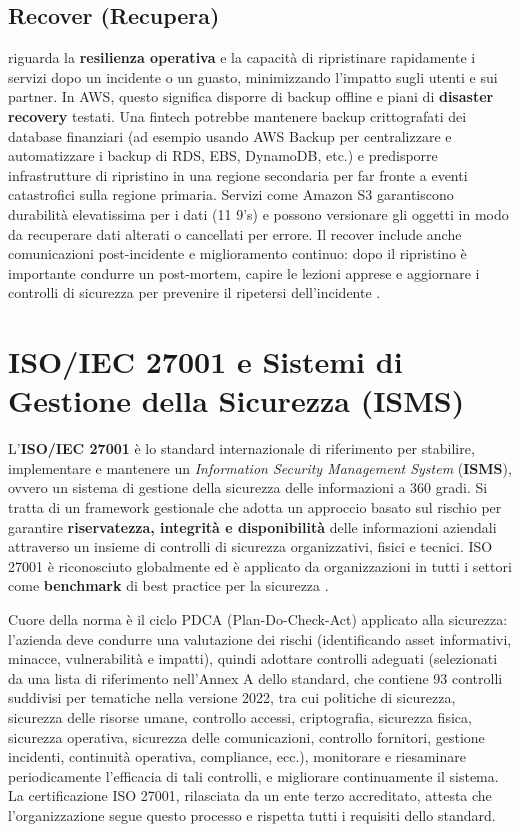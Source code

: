 \documentclass[a4paper,12pt]{report}
\begin{document}
\subsection{Recover (Recupera)}
\label{subsec:nist_csf_recover}
riguarda la \textbf{resilienza operativa} e la capacità di ripristinare rapidamente i servizi dopo un incidente o un guasto, minimizzando l'impatto sugli utenti e sui partner. In AWS, questo significa disporre di backup offline e piani di \textbf{disaster recovery} testati. Una fintech potrebbe mantenere backup crittografati dei database finanziari (ad esempio usando AWS Backup per centralizzare e automatizzare i backup di RDS, EBS, DynamoDB, etc.) e predisporre infrastrutture di ripristino in una regione secondaria per far fronte a eventi catastrofici sulla regione primaria. Servizi come Amazon S3 garantiscono durabilità elevatissima per i dati (11 9's) e possono versionare gli oggetti in modo da recuperare dati alterati o cancellati per errore. Il recover include anche comunicazioni post-incidente e miglioramento continuo: dopo il ripristino è importante condurre un post-mortem, capire le lezioni apprese e aggiornare i controlli di sicurezza per prevenire il ripetersi dell'incidente \cite{awsWhitepaper}.

\section{ISO/IEC 27001 e Sistemi di Gestione della Sicurezza (ISMS)}
\label{sec:iso_27001}
L'\textbf{ISO/IEC 27001} è lo standard internazionale di riferimento per stabilire, implementare e mantenere un \textit{Information Security Management System} (\textbf{ISMS}), ovvero un sistema di gestione della sicurezza delle informazioni a 360 gradi. Si tratta di un framework gestionale che adotta un approccio basato sul rischio per garantire \textbf{riservatezza, integrità e disponibilità} delle informazioni aziendali attraverso un insieme di controlli di sicurezza organizzativi, fisici e tecnici. ISO 27001 è riconosciuto globalmente ed è applicato da organizzazioni in tutti i settori come \textbf{benchmark} di best practice per la sicurezza \cite{hyperproofNist}.

Cuore della norma è il ciclo PDCA (Plan-Do-Check-Act) applicato alla sicurezza: l’azienda deve condurre una valutazione dei rischi (identificando asset informativi, minacce, vulnerabilità e impatti), quindi adottare controlli adeguati (selezionati da una lista di riferimento nell’Annex A dello standard, che contiene 93 controlli suddivisi per tematiche nella versione 2022, tra cui politiche di sicurezza, sicurezza delle risorse umane, controllo accessi, criptografia, sicurezza fisica, sicurezza operativa, sicurezza delle comunicazioni, controllo fornitori, gestione incidenti, continuità operativa, compliance, ecc.), monitorare e riesaminare periodicamente l’efficacia di tali controlli, e migliorare continuamente il sistema. La certificazione ISO 27001, rilasciata da un ente terzo accreditato, attesta che l’organizzazione segue questo processo e rispetta tutti i requisiti dello standard.
\end{document}
